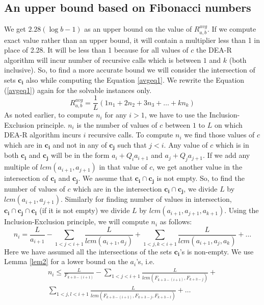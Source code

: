 \documentclass[pdflatex,sn-mathphys-num]{sn-jnl}%
\theoremstyle{thmstyleone}%
\theoremstyle{thmstyletwo}%
\theoremstyle{thmstylethree}%
\begin{document}
 \subsection{An upper bound based on Fibonacci numbers} We get $2.28(\log b -1)$ as an upper bound on the value of $R_{a,b}^{avg}$. If we compute exact value rather than an upper bound, it will contain a multiplier less than 1 in place of 2.28. It will be less than 1 because for all values of $c$ the DEA-R algorithm will incur number of recursive calls which is between $1$ and $k$ (both inclusive). So, to find a more accurate bound we will consider the intersection of sets $\mathbf{c_i}$
also while computing the Equation \ref{avgeq1}. We rewrite the Equation (\ref{avgeq1}) again for the solvable instances only.
\begin{equation}
\label{avgAgain}   R_{a,b}^{avg}=\frac{1}{L}(1n_1+2n_2+3n_3+\ldots+kn_k)
\end{equation} As noted earlier, to compute $n_i$ for any $i>1$, we have to use the Inclusion-Exclusion principle. $n_i$ is the number of values of $c$ between $1$ to $L$ on which DEA-R algorithm incurs $i$ recursive calls. To compute $n_i$ we find those values of $c$ which are in $\mathbf{c_i}$ and not in any of $\mathbf{c_j}$ such that $j<i$. Any value of $c$ which is in both $\mathbf{c_i}$ and $\mathbf{c_j}$ will be in the form $a_i+Q_ia_{i+1}$ and $a_j+Q_ja_{j+1}$. If we add any multiple of $lcm(a_{i+1},a_{j+1})$ in that value of $c$, we get another value in the intersection of $\mathbf{c_i}$ and $\mathbf{c_j}$. We assume that $\mathbf{c_i}\cap \mathbf{c_j}$ is not empty. So, to find the number of values of $c$ which are in the intersection  $\mathbf{c_i}\cap \mathbf{c_j}$, we divide $L$ by $lcm(a_{i+1},a_{j+1})$. Similarly for  finding number of values in intersection, $\mathbf{c_i}\cap\mathbf{c_j}\cap \mathbf{c_l}$ (if it is not empty) we divide $L$ by $lcm(a_{i+1},a_{j+1},a_{k+1})$. Using the Inclusion-Exclusion principle, we will compute $n_i$ as follows:
$$n_i=\frac{L}{a_{i+1}}-\sum_{1<j<i+1}\frac{L}{lcm(a_{i+1},a_j)}+\sum_{1<j,k<i+1}\frac{L}{lcm(a_{i+1},a_j,a_k)}+\ldots$$
Here we have assumed all the intersections of the sets $\mathbf{c_i}$'s is non-empty.
 We use Lemma \ref{lem2} for a lower bound on the $a_i$'s, i.e.
\begin{multline}\label{bound 14}
n_i\le\frac{L}{F_{k+3-{(i+1)}}}-\sum_{1<j<i+1}\frac{L}{lcm(F_{k+3-{(i+1)}},F_{k+3-j})}+\\\sum_{1<j,l<i+1}\frac{L}{lcm(F_{k+3-{(i+1)}},F_{k+3-{j}},F_{k+3-l})}+\ldots    
\end{multline}
\end{document}
